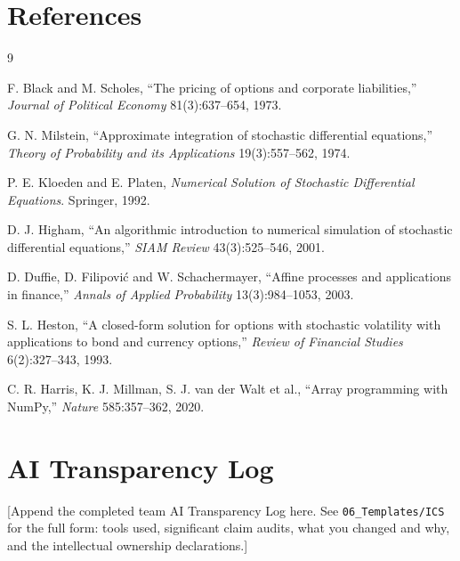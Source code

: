 \documentclass[11pt,a4paper]{article}
\theoremstyle{definition}
\theoremstyle{remark}
\begin{document}
\newpage
\section*{References}

\begin{thebibliography}{9}

 F. Black and M. Scholes, ``The pricing of options and
    corporate liabilities,'' \emph{Journal of Political Economy} 81(3):637--654,
    1973.

 G. N. Milstein, ``Approximate integration of stochastic
    differential equations,'' \emph{Theory of Probability and its Applications}
    19(3):557--562, 1974.

 P. E. Kloeden and E. Platen, \emph{Numerical Solution of
    Stochastic Differential Equations}. Springer, 1992.

 D. J. Higham, ``An algorithmic introduction to numerical
    simulation of stochastic differential equations,'' \emph{SIAM Review}
    43(3):525--546, 2001.

 D. Duffie, D. Filipovi\'c and W. Schachermayer, ``Affine processes
    and applications in finance,'' \emph{Annals of Applied Probability}
    13(3):984--1053, 2003.

 S. L. Heston, ``A closed-form solution for options with
    stochastic volatility with applications to bond and currency options,''
    \emph{Review of Financial Studies} 6(2):327--343, 1993.

 C. R. Harris, K. J. Millman, S. J. van der Walt et al.,
    ``Array programming with NumPy,'' \emph{Nature} 585:357--362, 2020.

\end{thebibliography}

\newpage
\appendix
\section{AI Transparency Log}

[Append the completed team AI Transparency Log here. See
\texttt{06\_Templates/ICS} for the full form: tools used, significant claim
audits, what you changed and why, and the intellectual ownership declarations.]
\end{document}
